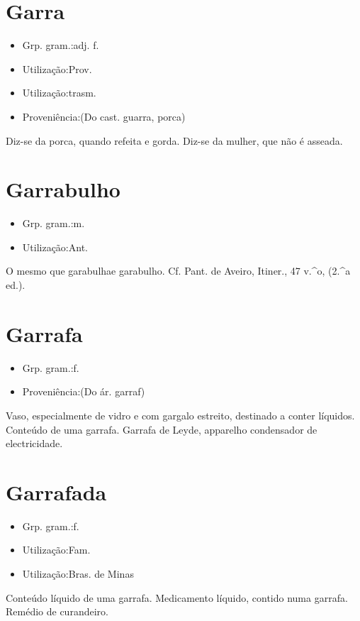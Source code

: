 \section{Garra}
\begin{itemize}
\item {Grp. gram.:adj. f.}
\end{itemize}
\begin{itemize}
\item {Utilização:Prov.}
\end{itemize}
\begin{itemize}
\item {Utilização:trasm.}
\end{itemize}
\begin{itemize}
\item {Proveniência:(Do cast. \textunderscore guarra\textunderscore , porca)}
\end{itemize}
Diz-se da porca, quando refeita e gorda.
Diz-se da mulher, que não é asseada.
\section{Garrabulho}
\begin{itemize}
\item {Grp. gram.:m.}
\end{itemize}
\begin{itemize}
\item {Utilização:Ant.}
\end{itemize}
O mesmo que \textunderscore garabulha\textunderscore  e \textunderscore garabulho\textunderscore . Cf. Pant. de Aveiro, \textunderscore Itiner.\textunderscore , 47 v.^o, (2.^a ed.).
\section{Garrafa}
\begin{itemize}
\item {Grp. gram.:f.}
\end{itemize}
\begin{itemize}
\item {Proveniência:(Do ár. \textunderscore garraf\textunderscore )}
\end{itemize}
Vaso, especialmente de vidro e com gargalo estreito, destinado a conter líquidos.
Conteúdo de uma garrafa.
\textunderscore Garrafa de Leyde\textunderscore , apparelho condensador de electricidade.
\section{Garrafada}
\begin{itemize}
\item {Grp. gram.:f.}
\end{itemize}
\begin{itemize}
\item {Utilização:Fam.}
\end{itemize}
\begin{itemize}
\item {Utilização:Bras. de Minas}
\end{itemize}
Conteúdo líquido de uma garrafa.
Medicamento líquido, contido numa garrafa.
Remédio de curandeiro.
